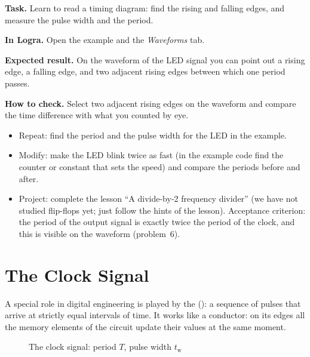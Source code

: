 \begin{diybox}
\textbf{Task.} Learn to read a timing diagram: find the rising and falling
edges, and measure the pulse width and the period.\par
\textbf{In Logra.} Open the example  and the \emph{Waveforms}
tab.\par
\textbf{Expected result.} On the waveform of the LED signal you can point out
a rising edge, a falling edge, and two adjacent rising edges between which one
period passes.\par
\textbf{How to check.} Select two adjacent rising edges on the waveform and
compare the time difference with what you counted by eye.
\begin{itemize}[leftmargin=3.4em,labelwidth=3em,labelsep=0.4em,align=left]
  \item[\stars{1}] Repeat: find the period and the pulse width for the LED in
    the  example.
  \item[\stars{2}] Modify: make the LED blink twice as fast (in the example
    code find the counter or constant that sets the speed) and compare the
    periods before and after.
  \item[\stars{3}] Project: complete the lesson ``A divide-by-2 frequency
    divider'' (we have not studied flip-flops yet; just follow the hints of
    the lesson). Acceptance criterion: the period of the output signal is
    exactly twice the period of the clock, and this is visible on the
    waveform (problem~6).
\end{itemize}
\end{diybox}

\section{The Clock Signal}

A special role in digital engineering is played by the 
(): a sequence of pulses that arrive at strictly equal intervals of
time. It works like a conductor: on its edges all the memory elements of the
circuit update their values at the same moment.

\begin{figure}[H]
\centering
{}
\caption{The clock signal: period $T$, pulse width $t_\text{w}$}
\end{figure}

